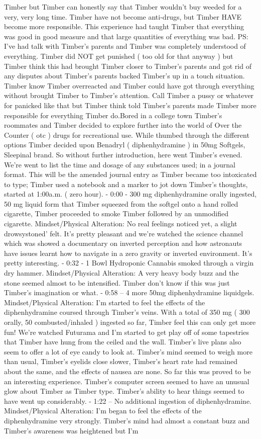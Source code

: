\documentclass[12pt]{book}
\begin{document}
Timber but Timber can honestly say that Timber wouldn't buy weeded for a very, very long time. Timber have not become anti-drugs, but Timber HAVE become more responsible. This experience had taught Timber that everything was good in good measure and that large quantities of everything was bad. PS: I've had talk with Timber's parents and Timber was completely understood of everything. Timber did NOT get punished ( too old for that anyway ) but Timber think this had brought Timber closer to Timber's parents and got rid of any disputes about Timber's parents backed Timber's up in a touch situation. Timber know Timber overreacted and Timber could have got through everything without brought Timber to Timber's attention. Call Timber a pussy or whatever for panicked like that but Timber think told Timber's parents made Timber more responsible for everything Timber do.Bored in a college town Timber's roommates and Timber decided to explore further into the world of Over the Counter ( otc ) drugs for recreational use. While thumbed through the different options Timber decided upon Benadryl ( diphenhydramine ) in 50mg Softgels, Sleepinal brand. So without further introduction, here went Timber's evened. We're went to list the time and dosage of any substances used; in a journal format. This will be the amended journal entry as Timber became too intoxicated to type; Timber used a notebook and a marker to jot down Timber's thoughts, started at 1:00a.m. ( zero hour). - 0:00 - 300 mg diphenhydramine orally ingested, 50 mg liquid form that Timber squeezed from the softgel onto a hand rolled cigarette, Timber proceeded to smoke Timber followed by an unmodified cigarette. Mindset/Physical Alteration: No real feelings noticed yet, a slight drowsystoned' felt. It's pretty pleasant and we're watched the science channel which was showed a documentary on inverted perception and how astronauts have issues learnt how to navigate in a zero gravity or inverted environment. It's pretty interesting. - 0:32 - 1 Bowl Hydroponic Cannabis smoked through a virgin dry hammer. Mindset/Physical Alteration: A very heavy body buzz and the stone seemed almost to be intensified. Timber don't know if this was just Timber's imagination or what. - 0:58 -- 4 more 50mg diphenhydramine liquidgels. Mindset/Physical Alteration: I'm started to feel the effects of the diphenhydramine coursed through Timber's veins. With a total of 350 mg ( 300 orally, 50 combusted/inhaled ) ingested so far, Timber feel this can only get more fun! We're watched Futurama and I'm started to get play off of some tapestries that Timber have hung from the ceiled and the wall. Timber's live plans also seem to offer a lot of eye candy to look at. Timber's mind seemed to weigh more than usual, Timber's eyelids close slower, Timber's heart rate had remained about the same, and the effects of nausea are none. So far this was proved to be an interesting experience. Timber's computer screen seemed to have an unusual glow about Timber as Timber type. Timber's ability to hear things seemed to have went up considerably. - 1:22 -- No additional ingestion of diphenhydramine. Mindset/Physical Alteration: I'm began to feel the effects of the diphenhydramine very strongly. Timber's mind had almost a constant buzz and Timber's awareness was heightened but I'm 
\end{document}
